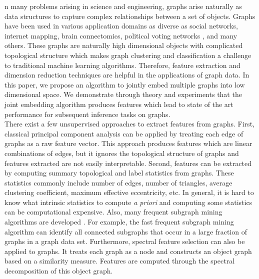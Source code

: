 \documentclass[10pt,journal,compsoc]{IEEEtran}
\begin{document}
\IEEEdisplaynontitleabstractindextext
\IEEEpeerreviewmaketitle


\noindent {}n many problems arising in science and engineering, graphs arise naturally as data structures to capture complex relationships between a set of objects. Graphs have been used in various application domains as diverse as social networks\cite{otte2002social}, internet mapping\cite{govindan2000heuristics}, brain connectomics\cite{bullmore2011brain}, political voting networks \cite{ward2011network},  and many others. These graphs are naturally high dimensional objects with complicated topological structure which makes graph clustering and classification a challenge to traditional machine learning algorithms. Therefore, feature extraction and dimension reduction techniques are helpful in the applications of graph data. In this paper, we propose an algorithm to jointly embed multiple graphs into low dimensional space. We demonstrate through theory and experiments that the joint embedding algorithm produces features which lead to state of the art performance for subsequent inference tasks on graphs.  \\

\noindent There exist a few unsupervised approaches to extract features from graphs. First, classical principal component analysis can be applied by treating each edge of graphs as a raw feature vector\cite{jolliffe2002principal}. This approach produces features which are linear combinations of edges, but it ignores the topological structure of graphs and features extracted are not easily interpretable. Second, features can be extracted by computing summary topological and label statistics from graphs\cite{li2011graph}. These statistics commonly include number of edges, number of triangles, average clustering coefficient, maximum effective eccentricity, etc. In general, it is hard to know what intrinsic statistics to compute \textit{a priori} and computing some statistics can be computational expensive. Also, many frequent subgraph mining algorithms are developed \cite{jiang2013survey}. For example, the fast frequent subgraph mining algorithm can identify all connected subgraphs that occur in a large fraction of graphs in a graph data set\cite{huan2003efficient}. Furthermore, spectral feature selection can also be applied to graphs. It treats each graph as a node and constructs an object graph based on a similarity measure. Features are computed through the spectral decomposition of this object graph\cite{zhao2007spectral}. \\
\end{document}
